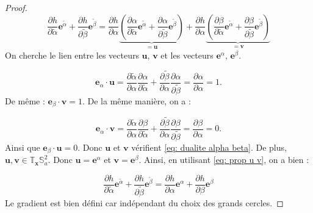 \begin{proof}
\begin{equation}
\dfrac{\partial h}{\partial \tilde{\alpha}} \mathbf{e}^{\tilde{\alpha}} + \dfrac{\partial h}{\partial \tilde{\beta}} \mathbf{e}^{\tilde{\beta}} = \dfrac{\partial h}{\partial \alpha}  \underbrace{\left( \dfrac{\partial \alpha}{\partial \tilde{\alpha}} \mathbf{e}^{\tilde{\alpha}} + \dfrac{\partial \alpha}{\partial \tilde{\beta}} \mathbf{e}^{\tilde{\beta}}  \right)} _{=\mathbf{u}} + \dfrac{\partial h}{\partial \alpha}  \underbrace{\left( \dfrac{\partial \beta}{\partial \tilde{\alpha}} \mathbf{e}^{\tilde{\alpha}} + \dfrac{\partial \beta}{\partial \tilde{\beta}} \mathbf{e}^{\tilde{\beta}} \right)}_{= \mathbf{v}} 
\label{eq: prop u v}
\end{equation}
On cherche le lien entre les vecteurs $\mathbf{u}$, $\mathbf{v}$ et les vecteurs $\mathbf{e}^{\alpha}$, $\mathbf{e}^{\beta}$.

\begin{equation}
\mathbf{e}_{\alpha} \cdot \mathbf{u} = \dfrac{\partial \tilde{\alpha}}{\partial \alpha} \dfrac{\partial \alpha}{\partial \tilde{\alpha}} + \dfrac{\partial \tilde{\beta}}{\partial \alpha} \dfrac{\partial \alpha}{\partial \tilde{\beta}} = \dfrac{\partial \alpha}{\partial \alpha} = 1.
\end{equation}
De même : $\mathbf{e}_{\beta} \cdot \mathbf{v} = 1$.
De la même manière, on a :

\begin{equation}
\mathbf{e}_{\alpha} \cdot \mathbf{v} = \dfrac{\partial \tilde{\alpha}}{\partial \alpha} \dfrac{\partial \beta}{\partial \tilde{\alpha}} + \dfrac{\partial \tilde{\beta}}{\partial \alpha} \dfrac{\partial \beta}{\partial \tilde{\beta}} = \dfrac{\partial \beta}{\partial \alpha} = 0.
\end{equation}
Ainsi que $\mathbf{e}_{\beta} \cdot \mathbf{u} = 0$.
Donc $\mathbf{u}$ et $\mathbf{v}$ vérifient \eqref{eq: dualite alpha beta}. De plus, $\mathbf{u}, \mathbf{v} \in \mathbb{T}_{\mathbf{x}} \mathbb{S}_a^2$. Donc $\mathbf{u} = \mathbf{e}^{\alpha}$ et $\mathbf{v} = \mathbf{e}^{\beta}$. Ainsi, en utilisant \eqref{eq: prop u v}, on a bien :

\begin{equation}
\dfrac{\partial h}{\partial \tilde{\alpha}} \mathbf{e}^{\tilde{\alpha}} + \dfrac{\partial h}{\partial \tilde{\beta}} \mathbf{e}^{\tilde{\beta}} = \dfrac{\partial h}{\partial \alpha} \mathbf{e}^{\alpha} + \dfrac{\partial h}{\partial \beta} \mathbf{e}^{\beta}
\end{equation}
Le gradient est bien défini car indépendant du choix des grands cercles.
\end{proof}



